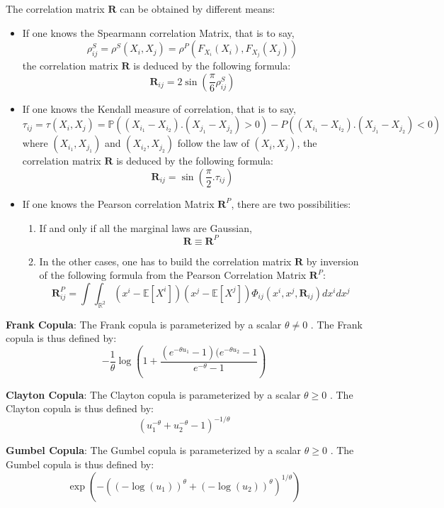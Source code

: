{  The correlation matrix $\mathbf R$ can be obtained by different means:
  \begin{itemize}
  \item If one knows the Spearmann correlation Matrix, that is to say,
    $$
    \rho_{ij}^S = \rho^S(X_i,X_j) = \rho^P(F_{X_i}(X_i),F_{X_j}(X_j))
    $$
    the correlation matrix $\mathbf R$ is deduced by the following formula:
    $$
    \mathbf R_{ij} = 2 \sin(\frac{\pi}{6}\rho_{ij}^S)
    $$
  \item If one knows the Kendall measure of correlation, that is to say,
    $$
    \tau_{ij} = \tau(X_i,X_j) = \mathbb P\left((X_{i_1} - X_{i_2}).(X_{j_1} - X_{j_2}) > 0 \right) - P\left((X_{i_1} - X_{i_2}).(X_{j_1} - X_{j_2}) < 0 \right)
    $$
    where $(X_{i_1},X_{j_1})$ and $(X_{i_2},X_{j_2})$ follow the law of $(X_i,X_j)$,
    the correlation matrix $\mathbf R$ is deduced by the following formula:
    $$
    \mathbf R_{ij} = \sin(\frac{\pi}{2} . \tau_{ij})
    $$
  \item If one knows the Pearson correlation Matrix $\mathbf R^P$, there are two possibilities:
    \begin{enumerate}
    \item       If and only if all the marginal laws are Gaussian,
      $$
      \mathbf R \equiv \mathbf R^P
      $$
    \item
      In the other cases, one has to build the correlation matrix $\mathbf R$ by inversion of the following formula from the Pearson Correlation Matrix $\mathbf R^P$:
      $$
      \mathbf R_{ij}^P = \int \int_{\mathbb R^2} (x^i-\mathbb E[X^i])(x^j-\mathbb E[X^j]) \Phi_{ij}(x^i,x^j,\mathbf R_{ij})dx^i dx^j
      $$
    \end{enumerate}
  \end{itemize}



  {\bf Frank Copula}: The Frank copula is parameterized by a scalar $\theta \neq 0 $  . The Frank copula is thus defined by:
  $$
  \displaystyle -\frac{1}{\theta}\log\left(1+\frac{(e^{-\theta u_1}-1)(e^{-\theta u_2}-1}{e^{-\theta}-1}\right)
  $$


  {\bf Clayton Copula}: The Clayton copula is parameterized by a scalar $\theta \geq 0 $ . The Clayton copula is thus defined by:
  $$
  \displaystyle \left(u_1^{-\theta}+u_2^{-\theta}-1\right)^{-1/\theta}
  $$


  {\bf Gumbel Copula}: The Gumbel copula is parameterized by a scalar $\theta \geq 0 $ . The Gumbel copula is thus defined by:
  $$
  \displaystyle \exp\left(-\left((-\log(u_1))^{\theta}+(-\log(u_2))^{\theta}\right)^{1/\theta}\right)
  $$

}
